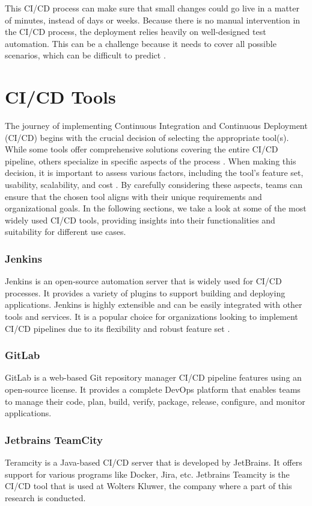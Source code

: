 This CI/CD process can make sure that small changes could go live in a matter of minutes, instead of days or weeks. 
Because there is no manual intervention in the CI/CD process, the deployment relies heavily on well-designed test automation.
This can be a challenge because it needs to cover all possible scenarios, which can be difficult to predict \autocite{Hat2023}.

\section{CI/CD Tools}
The journey of implementing Continuous Integration and Continuous Deployment (CI/CD) begins with the crucial decision of selecting the appropriate tool(s). 
While some tools offer comprehensive solutions covering the entire CI/CD pipeline, others specialize in specific aspects of the process \autocite{Hat2023}. 
When making this decision, it is important to assess various factors, including the tool's feature set, usability, scalability, and cost \autocite{Synopsys}. 
By carefully considering these aspects, teams can ensure that the chosen tool aligns with their unique requirements and organizational goals.
In the following sections, we take a look at some of the most widely used CI/CD tools, providing insights into their functionalities and suitability for different use cases.

\subsubsection{Jenkins}
Jenkins is an open-source automation server that is widely used for CI/CD processes. It provides a variety of plugins to support building and deploying applications. 
Jenkins is highly extensible and can be easily integrated with other tools and services. 
It is a popular choice for organizations looking to implement CI/CD pipelines due to its flexibility and robust feature set \autocite{Hat2023}.

\subsubsection{GitLab}
GitLab is a web-based Git repository manager CI/CD pipeline features using an open-source license.
It provides a complete DevOps platform that enables teams to manage their code, plan, build, verify, package, release, configure, and monitor applications.

\subsubsection{Jetbrains TeamCity}
Teramcity is a Java-based CI/CD server that is developed by JetBrains. It offers support for various programs like Docker, Jira, etc.
Jetbrains Teamcity is the CI/CD tool that is used at Wolters Kluwer, the company where a part of this research is conducted.



